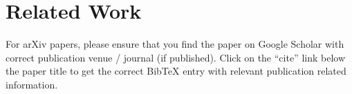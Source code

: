 \section{Related Work}\label{sec:related}

For arXiv papers,
please ensure that you find the paper on Google Scholar
with correct publication venue / journal (if published).
Click on the ``cite'' link below the paper title
to get the correct BibTeX entry
with relevant publication related information.

